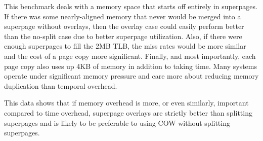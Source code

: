 This benchmark deals with a memory space that starts off entirely in superpages. If there was some nearly-aligned memory that never would be merged into a superpage without overlays, then the overlay case could easily perform better than the no-split case due to better superpage utilization. Also, if there were enough superpages to fill the 2MB TLB, the miss rates would be more similar and the cost of a page copy more significant. Finally, and most importantly, each page copy also uses up 4KB of memory in addition to taking time. Many systems operate under significant memory pressure and care more about reducing memory duplication than temporal overhead.

This data shows that if memory overhead is more, or even similarly, important compared to time overhead, superpage overlays are strictly better than splitting superpages and is likely to be preferable to using COW without splitting superpages.
